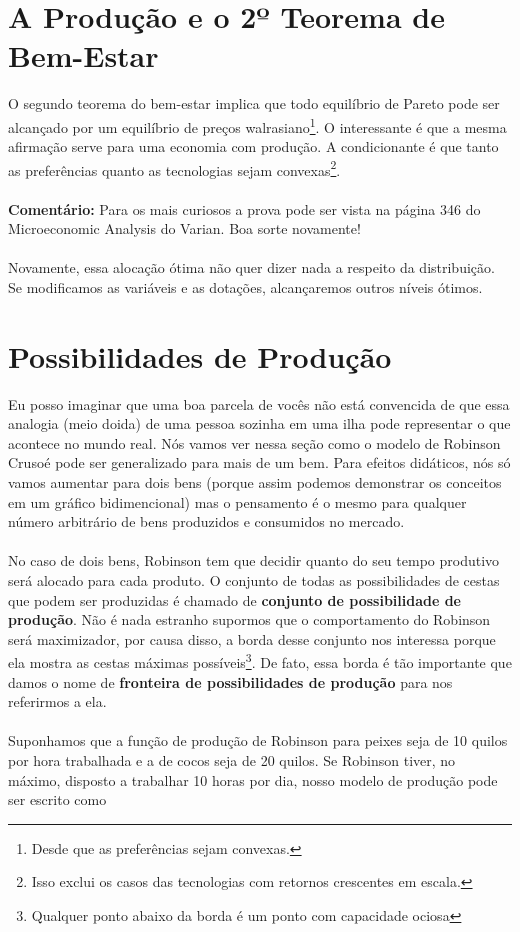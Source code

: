\documentclass[a4paper,11pt,oneside]{book}
\theoremstyle{definition}
\theoremstyle{break}
\begin{document}
\section{A Produção e o 2º Teorema de Bem-Estar}

O segundo teorema do bem-estar implica que todo equilíbrio de Pareto pode ser alcançado por um equilíbrio de preços walrasiano\footnote{Desde que as preferências sejam convexas.}. O interessante é que a mesma afirmação serve para uma economia com produção. A condicionante é que tanto as preferências quanto as tecnologias sejam convexas\footnote{Isso exclui os casos das tecnologias com retornos crescentes em escala.}.
\\
\\
\textbf{Comentário:} Para os mais curiosos a prova pode ser vista na página 346 do Microeconomic Analysis do Varian. Boa sorte novamente!
\\
\\
Novamente, essa alocação ótima não quer dizer nada a respeito da distribuição. Se modificamos as variáveis e as dotações, alcançaremos outros níveis ótimos.

\section{Possibilidades de Produção}

Eu posso imaginar que uma boa parcela de vocês não está convencida de que essa analogia (meio doida) de uma pessoa sozinha em uma ilha pode representar o que acontece no mundo real. Nós vamos ver nessa seção como o modelo de Robinson Crusoé pode ser generalizado para mais de um bem. Para efeitos didáticos, nós só vamos aumentar para dois bens (porque assim podemos demonstrar os conceitos em um gráfico bidimencional) mas o pensamento é o mesmo para qualquer número arbitrário de bens produzidos e consumidos no mercado.
\\
\\
No caso de dois bens, Robinson tem que decidir quanto do seu tempo produtivo será alocado para cada produto. O conjunto de todas as possibilidades de cestas que podem ser produzidas é chamado de \textbf{conjunto de possibilidade de produção}. Não é nada estranho supormos que o comportamento do Robinson será maximizador, por causa disso, a borda desse conjunto nos interessa porque ela mostra as cestas máximas possíveis\footnote{Qualquer ponto abaixo da borda é um ponto com capacidade ociosa}. De fato, essa borda é tão importante que damos o nome de \textbf{fronteira de possibilidades de produção} para nos referirmos a ela.
\\
\\
Suponhamos que a função de produção de Robinson para peixes seja de 10 quilos por hora trabalhada e a de cocos seja de 20 quilos. Se Robinson tiver, no máximo, disposto a trabalhar 10 horas por dia, nosso modelo de produção pode ser escrito como
\end{document}
